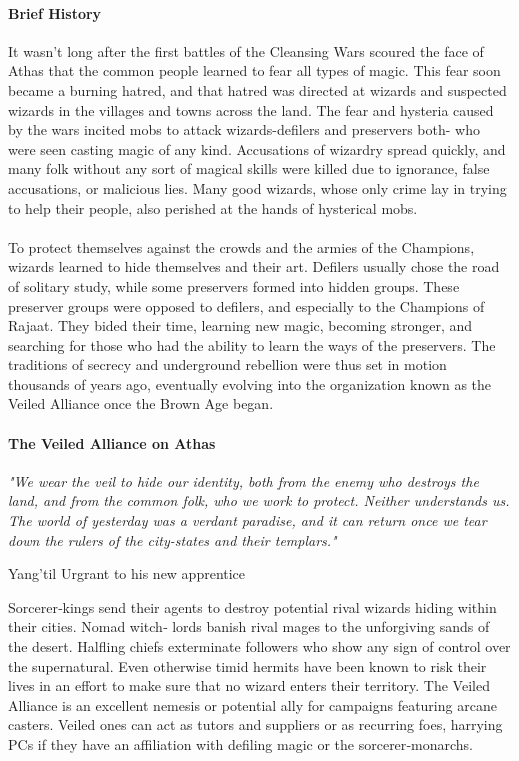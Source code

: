 \begin{multicols}{2}
\paragraph{Brief History}
It wasn’t long after the first battles of the Cleansing
Wars scoured the face of Athas that the common people
learned to fear all types of magic. This fear soon became a
burning hatred, and that hatred was directed at wizards
and suspected wizards in the villages and towns across
the land. The fear and hysteria caused by the wars incited
mobs to attack wizards-defilers and preservers both-
who were seen casting magic of any kind. Accusations of
wizardry spread quickly, and many folk without any sort
of magical skills were killed due to ignorance, false
accusations, or malicious lies. Many good wizards, whose
only crime lay in trying to help their people, also perished
at the hands of hysterical mobs.\\
\\
To protect themselves against the crowds and the
armies of the Champions, wizards learned to hide
themselves and their art. Defilers usually chose the road
of solitary study, while some preservers formed into
hidden groups. These preserver groups were opposed to
defilers, and especially to the Champions of Rajaat. They
bided their time, learning new magic, becoming stronger,
and searching for those who had the ability to learn the
ways of the preservers. The traditions of secrecy and
underground rebellion were thus set in motion thousands
of years ago, eventually evolving into the organization
known as the Veiled Alliance once the Brown Age began.

\paragraph{The Veiled Alliance on Athas}
\epigraph{\textit{
"We wear the veil to hide our identity, both from the
enemy who destroys the land, and from the common folk,
who we work to protect. Neither understands us. The
world of yesterday was a verdant paradise, and it can
return once we tear down the rulers of the city-states and
their templars."}}
{ Yang'til Urgrant to his new apprentice }

Sorcerer‐kings send their agents to destroy potential
rival wizards hiding within their cities. Nomad witch‐
lords banish rival mages to the unforgiving sands of the
desert. Halfling chiefs exterminate followers who show
any sign of control over the supernatural. Even otherwise
timid hermits have been known to risk their lives in an
effort to make sure that no wizard enters their territory.
The Veiled Alliance is an excellent nemesis or
potential ally for campaigns featuring arcane casters.
Veiled ones can act as tutors and suppliers or as recurring
foes, harrying PCs if they have an affiliation with defiling
magic or the sorcerer‐monarchs.


\end{multicols}
